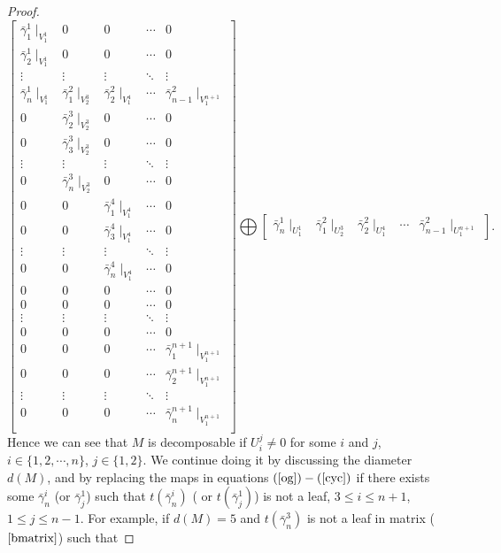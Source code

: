 \documentclass[a4paper,12pt]{amsart}
\newcommand{\bg}{\bar{\gamma}}
\begin{document}
\begin{proof}
\begin{equation}
\begin{bmatrix}
\bg^1_1\mid_{V^1_1} & 0  & 0 & \cdots & 0 \\
\bg^1_2\mid_{V^1_1} & 0 & 0& \cdots & 0\\
\vdots &   \vdots & \vdots & \ddots  & \vdots \\
\bg^1_n\mid_{V^1_1} & \bg^2_1\mid_{V^3_2} & \bg^2_2\mid_{V^4_1}& \cdots & \bg^2_{n-1}\mid_{V^{n+1}_1}\\
0 & \bg^3_2\mid_{V^3_2} & 0 & \cdots & 0 \\
0 & \bg^3_3\mid_{V^3_2} & 0 & \cdots & 0 \\
\vdots &   \vdots & \vdots & \ddots  & \vdots \\
0 & \bg^3_n\mid_{V^3_2} & 0 & \cdots & 0 \\
0 & 0 & \bg^4_1\mid_{V^4_1} & \cdots & 0 \\
0 & 0 & \bg^4_3\mid_{V^4_1} & \cdots & 0 \\
\vdots &   \vdots & \vdots & \ddots  & \vdots \\
0 & 0 & \bg^4_n\mid_{V^4_1} & \cdots & 0 \\
0 & 0 & 0 & \cdots & 0 \\
0 & 0 & 0 & \cdots & 0 \\
\vdots &   \vdots & \vdots & \ddots  & \vdots \\
0 & 0 & 0 & \cdots & 0 \\
0 & 0 & 0 & \cdots & \bg^{n+1}_1\mid_{V^{n+1}_1} \\
0 & 0 & 0 & \cdots & \bg^{n+1}_2\mid_{V^{n+1}_1} \\
\vdots &   \vdots & \vdots & \ddots  & \vdots \\
0 & 0 & 0 & \cdots & \bg^{n+1}_n\mid_{V^{n+1}_1} \\
\end{bmatrix} \bigoplus \begin{bmatrix}
\bg^1_n\mid_{U^1_1} & \bg^2_1\mid_{U^3_2} &\bg^2_2\mid_{U^4_1} & \cdots & \bg^2_{n-1}\mid_{U^{n+1}_1}
\end{bmatrix}.
\end{equation}
Hence we can see that $M$ is decomposable if  $U^j_i\neq 0$ for some $i$ and $j$, $i\in \{1,2,\cdots,n\}$, $j\in \{1,2\}$.   
We continue doing it by discussing the diameter $d(M)$,  and by replacing the maps in equations $(\ref{og})-(\ref{cyc})$ if there exists some $\bg^i_n$ (or $\bg^1_j$) such that $t(\bg^i_n)$ ( or $t(\bg^1_j)$) is not a leaf,  $ 3\leq i\leq n+1$, $1\leq j\leq n-1$. For example, if $d(M)=5$ and $t(\bg^3_n)$ is not a leaf in matrix ($\ref{bmatrix}$) such that





\end{proof}
\end{document}
